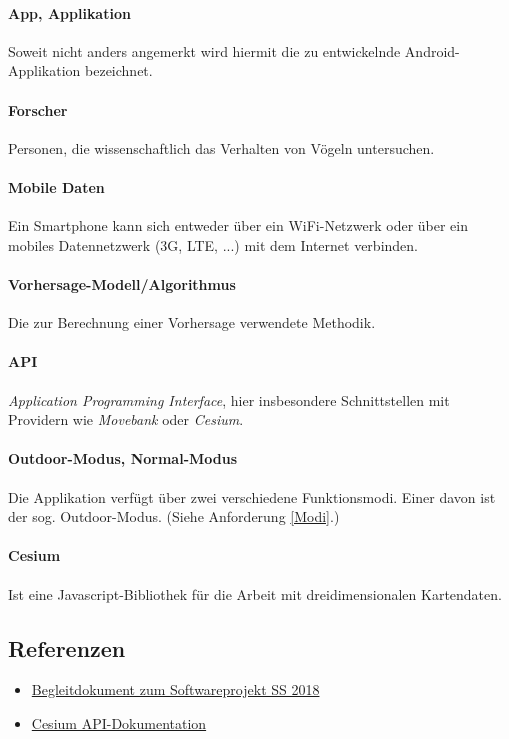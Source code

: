 \documentclass[12pt]{article} %
\begin{document}
\paragraph{App, Applikation} Soweit nicht anders angemerkt wird hiermit die zu entwickelnde Android-Applikation bezeichnet.
 \paragraph{Forscher} Personen, die wissenschaftlich das Verhalten von Vögeln untersuchen.
 \paragraph{Mobile Daten} Ein Smartphone kann sich entweder über ein WiFi-Netzwerk oder über ein mobiles Datennetzwerk (3G, LTE, ...) mit dem Internet verbinden. 
\paragraph{Vorhersage-Modell/Algorithmus} Die zur Berechnung einer Vorhersage verwendete Methodik. 
\paragraph{API} \textit{Application Programming Interface}, hier insbesondere Schnittstellen mit Providern wie \textit{Movebank} oder \textit{Cesium}. 
\paragraph{Outdoor-Modus, Normal-Modus} Die Applikation verfügt über zwei verschiedene Funktionsmodi. Einer davon ist der sog. Outdoor-Modus. (Siehe Anforderung \ref{Modi}.)
\paragraph{Cesium} Ist eine Javascript-Bibliothek für die Arbeit mit dreidimensionalen Kartendaten.

\subsection{Referenzen}

\begin{itemize} 
 	 \item  \href{https://docs.google.com/document/d/1Yc2f18JFaHyhrgM2h2WiATQ0zVmZnsc9W1ImhwWJF-g/edit?usp=sharing}{Begleitdokument zum Softwareprojekt SS 2018}
 	 \item \href{https://cesiumjs.org/refdoc/}{Cesium API-Dokumentation}
\end{itemize} 
\end{document}
